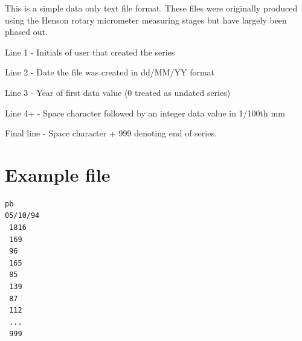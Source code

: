 This is a simple data only text file format. These files were originally produced using the Henson rotary micrometer measuring stages but have largely been phased out. 

\begin{itemize*}
 \item Line 1 - Initials of user that created the series
 \item Line 2 - Date the file was created in dd/MM/YY format
 \item Line 3 - Year of first data value (0 treated as undated series)
 \item Line 4+ - Space character followed by an integer data value in 1/100th mm
 \item Final line - Space character + 999 denoting end of series. 
\end{itemize*}

\section{Example file}
\begin{lstlisting}
pb
05/10/94
 1816 
 169 
 96 
 165 
 85 
 139 
 87 
 112  
 ... 
 999
\end{lstlisting}


